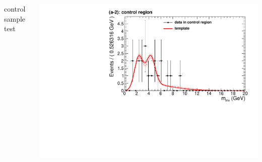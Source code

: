 \documentclass[compress]{beamer}
\begin{document}
\begin{frame}
\begin{columns}
\centering control sample test

\includegraphics[width=\linewidth]{template_control__bkg_model_a2_inv__m_inv.pdf}
\end{columns}
\end{frame}
\end{document}
